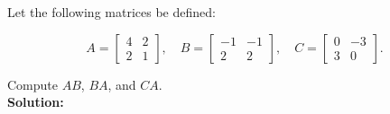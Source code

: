 
\item Let the following matrices be defined:

$$
A = \begin{bmatrix}
    4 & 2 \\
    2 & 1
\end{bmatrix},
\quad
B = \begin{bmatrix}
    -1 & -1 \\
    2 & 2
\end{bmatrix},
\quad
C = \begin{bmatrix}
    0 & -3 \\
    3 & 0
\end{bmatrix}.
$$

Compute $AB$, $BA$, and $CA$.\\
\textbf{Solution:}


